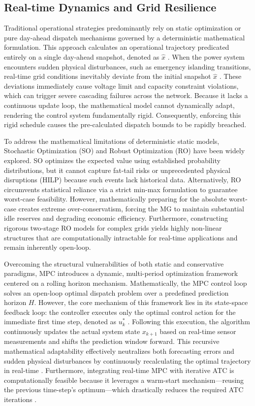 \subsection{Real-time Dynamics and Grid Resilience}
Traditional operational strategies predominantly rely on static optimization or pure day-ahead dispatch mechanisms governed by a deterministic mathematical formulation. This approach calculates an operational trajectory predicated entirely on a single day-ahead snapshot, denoted as $\hat{x}$ \cite{Liu2020Robust, Huynh2024Water}. When the power system encounters sudden physical disturbances, such as emergency islanding transitions, real-time grid conditions inevitably deviate from the initial snapshot $\hat{x}$ \cite{zhang2021multi, wu2021model}. These deviations immediately cause voltage limit and capacity constraint violations, which can trigger severe cascading failures across the network. Because it lacks a continuous update loop, the mathematical model cannot dynamically adapt, rendering the control system fundamentally rigid. Consequently, enforcing this rigid schedule causes the pre-calculated dispatch bounds to be rapidly breached.

To address the mathematical limitations of deterministic static models, Stochastic Optimization (SO) and Robust Optimization (RO) have been widely explored. SO optimizes the expected value using established probability distributions, but it cannot capture fat-tail risks or unprecedented physical disruptions (HILP) because such events lack historical data. Alternatively, RO circumvents statistical reliance via a strict min-max formulation to guarantee worst-case feasibility. However, mathematically preparing for the absolute worst-case creates extreme over-conservatism, forcing the MG to maintain substantial idle reserves and degrading economic efficiency. Furthermore, constructing rigorous two-stage RO models for complex grids yields highly non-linear structures that are computationally intractable for real-time applications and remain inherently open-loop.

Overcoming the structural vulnerabilities of both static and conservative paradigms, MPC introduces a dynamic, multi-period optimization framework centered on a rolling horizon mechanism. Mathematically, the MPC control loop solves an open-loop optimal dispatch problem over a predefined prediction horizon $H$. However, the core mechanism of this framework lies in its state-space feedback loop: the controller executes only the optimal control action for the immediate first time step, denoted as $u_k^*$ \cite{Elkazaz2019Energy}. Following this execution, the algorithm continuously updates the actual system state $x_{k+1}$ based on real-time sensor measurements and shifts the prediction window forward. This recursive mathematical adaptability effectively neutralizes both forecasting errors and sudden physical disturbances by continuously recalculating the optimal trajectory in real-time \cite{Parisio2014_MPC}. Furthermore, integrating real-time MPC with iterative ATC is computationally feasible because it leverages a warm-start mechanism---reusing the previous time-step's optimum---which drastically reduces the required ATC iterations \cite{zheng2023distributed}.

